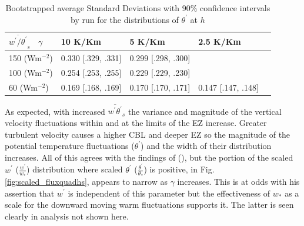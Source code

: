 \begin{table}[htbp]
\caption[]{Bootstrapped average Standard Deviations with 90$\%$ confidence intervals by run for the distributions of $\theta^{'}$ at $h$}
    

    \begin{tabular}{p{2.2cm} p{2.2cm}  p{2.2cm}  p{2.2cm} p{2.2cm} }
     
     $\overline{w^{'}/\theta^{'}}_{s}$ \ $\gamma$ & 10 K/Km & 5 K/Km & 2.5 K/Km  \\ \hline
     150 (Wm$^{-2}$)&  0.330 [.329, .331]& 0.299 [.298, .300]& \\
     100 (Wm$^{-2}$)&  0.254 [.253, .255]& 0.229 [.229, .230]& \\
     60 (Wm$^{-2}$) &  0.169 [.168, .169]& 0.170 [.170, .171]& 0.147 [.147, .148]\\ \hline
    \end{tabular}

\label{tab:stdevtheta}       
\end{table}

As expected, with increased $\overline{w^{'}\theta^{'}}_{s}$ the variance and magnitude of the vertical velocity fluctuations within and at the limits of the EZ increase.  Greater turbulent velocity causes a higher CBL and deeper EZ so the magnitude of the potential temperature fluctuations ($\theta^{'}$) and the width of their distribution increases. All of this agrees with the findings of \citeauthor{Sorbjan1} (\citeyear{Sorbjan1}), but the portion of the scaled $w^{'}$ ($\frac{w^{'}}{w_{*}}$) distribution where scaled $\theta^{'}$ ($\frac{\theta^{'}}{\theta_{*}}$) is positive, in Fig. \ref{fig:scaled_fluxquadhs}, appears to narrow as $\gamma$ increases. This is at odds with his assertion that $w^{'}$ is independent of this parameter but the effectiveness of $w_{*}$ as a scale for the downward moving warm fluctuations supports it. The latter is seen clearly in analysis not shown here.\\


